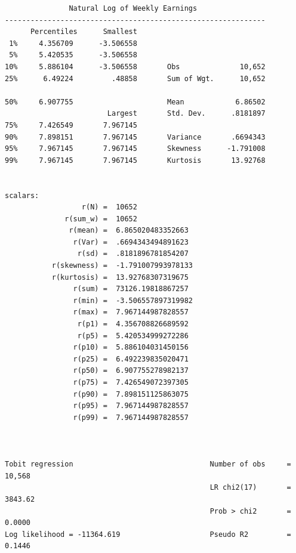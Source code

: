 \documentclass[
]{book}
\begin{document}
\begin{verbatim}
               Natural Log of Weekly Earnings
-------------------------------------------------------------
      Percentiles      Smallest
 1%     4.356709      -3.506558
 5%     5.420535      -3.506558
10%     5.886104      -3.506558       Obs              10,652
25%      6.49224         .48858       Sum of Wgt.      10,652

50%     6.907755                      Mean            6.86502
                        Largest       Std. Dev.      .8181897
75%     7.426549       7.967145
90%     7.898151       7.967145       Variance       .6694343
95%     7.967145       7.967145       Skewness      -1.791008
99%     7.967145       7.967145       Kurtosis       13.92768


scalars:
                  r(N) =  10652
              r(sum_w) =  10652
               r(mean) =  6.865020483352663
                r(Var) =  .6694343494891623
                 r(sd) =  .8181896781854207
           r(skewness) =  -1.791007993978133
           r(kurtosis) =  13.92768307319675
                r(sum) =  73126.19818867257
                r(min) =  -3.506557897319982
                r(max) =  7.967144987828557
                 r(p1) =  4.356708826689592
                 r(p5) =  5.420534999272286
                r(p10) =  5.886104031450156
                r(p25) =  6.492239835020471
                r(p50) =  6.907755278982137
                r(p75) =  7.426549072397305
                r(p90) =  7.898151125863075
                r(p95) =  7.967144987828557
                r(p99) =  7.967144987828557



Tobit regression                                Number of obs     =     10,568
                                                LR chi2(17)       =    3843.62
                                                Prob > chi2       =     0.0000
Log likelihood = -11364.619                     Pseudo R2         =     0.1446


\end{verbatim}
\end{document}
